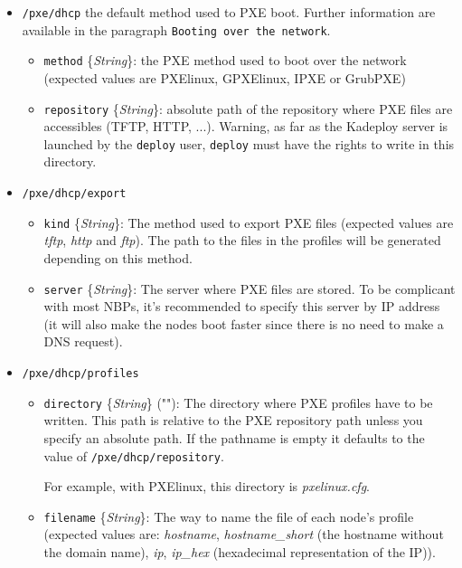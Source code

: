 \documentclass[a4wide,10pt,oneside]{book}
\newcommand{\ypath}[1]{\texttt{#1}}
\newcommand{\yfield}[2]{\texttt{#1} {\small\{{\emph{#2}}\}}:}
\newcommand{\yfieldd}[3]{\texttt{#1} {\small\{{\emph{#2}}\}} {\small(}#3{\small)}:}
\begin{document}
\begin{itemize}
  \item \ypath{/pxe/dhcp} the default method used to PXE boot. Further information are available in the paragraph \texttt{Booting over the network}.
  \begin{itemize}
    \item \yfield{method}{String} the PXE method used to boot over the network (expected values are PXElinux, GPXElinux, IPXE or GrubPXE)
    \item \yfield{repository}{String} absolute path of the repository where PXE files are accessibles (TFTP, HTTP, ...). Warning, as far as the Kadeploy server is launched by the \texttt{deploy} user, \texttt{deploy} must have the rights to write in this directory.
  \end{itemize}
  \item \ypath{/pxe/dhcp/export}
  \begin{itemize}
    \item \yfield{kind}{String} The method used to export PXE files (expected values are \emph{tftp}, \emph{http} and \emph{ftp}). The path to the files in the profiles will be generated depending on this method.
    \item \yfield{server}{String} The server where PXE files are stored. To be complicant with most NBPs, it's recommended to specify this server by IP address (it will also make the nodes boot faster since there is no need to make a DNS request).
  \end{itemize}
  \item \ypath{/pxe/dhcp/profiles}
  \begin{itemize}
    \item \yfieldd{directory}{String}{""} The directory where PXE profiles have to be written. This path is relative to the PXE repository path unless you specify an absolute path. If the pathname is empty it defaults to the value of \ypath{/pxe/dhcp/repository}.

For example, with PXElinux, this directory is \emph{pxelinux.cfg}.
    \item \yfield{filename}{String} The way to name the file of each node's profile (expected values are: \emph{hostname}, \emph{hostname\_short} (the hostname without the domain name), \emph{ip}, \emph{ip\_hex} (hexadecimal representation of the IP)).


\end{itemize}
\end{itemize}
\end{document}
